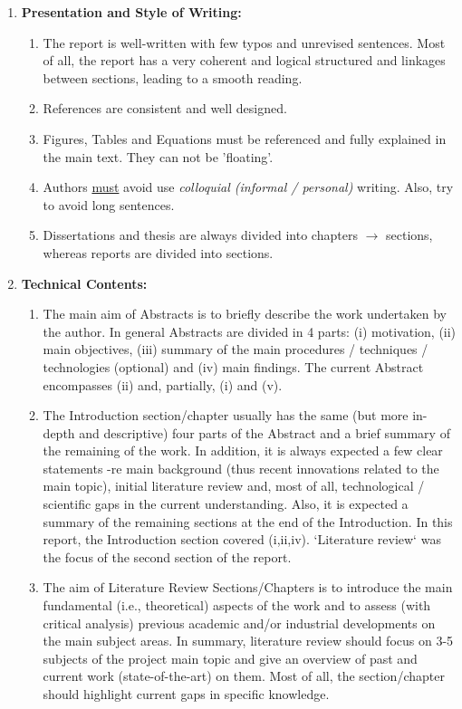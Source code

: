 \documentclass[14pt,twoside]{report}
\begin{document}
\begin{enumerate}
%
    \item {\bf Presentation and Style of Writing:}
                \begin{enumerate}
                   \item The report is well-written with few typos and unrevised sentences. Most of all, the report has a very coherent and logical structured and linkages between sections, leading to a smooth reading.
                   \item References are consistent and well designed. 
                   \item Figures, Tables and Equations must be referenced and fully explained in the main text. They can not be 'floating'.
                   \item Authors \underline{must} avoid use {\it colloquial (informal / personal)} writing. Also, try to avoid long sentences.
                   \item Dissertations and thesis are always divided into chapters $\rightarrow$ sections, whereas reports are divided into sections.
                \end{enumerate}
%
    \item {\bf Technical Contents:}
                \begin{enumerate}
                   \item The main aim of Abstracts is to briefly describe the work undertaken by the author. In general Abstracts are divided in 4 parts: (i) motivation, (ii) main objectives, (iii) summary of the main procedures / techniques / technologies (optional) and (iv) main findings. The current Abstract encompasses (ii) and, partially, (i) and (v).
                   \item The Introduction section/chapter usually has the same (but more in-depth and descriptive) four parts of the Abstract and a brief summary of the remaining of the work. In addition, it is always expected a few clear statements -re main background (thus recent innovations related to the main topic), initial literature review and, most of all, technological / scientific gaps in the current understanding. Also, it is expected a summary of the remaining sections at the end of the Introduction. In this report, the Introduction section covered (i,ii,iv). `Literature review` was the focus of the second section of the report. 
                   \item The aim of Literature Review Sections/Chapters is to introduce the main fundamental (i.e., theoretical) aspects of the work and to assess (with critical analysis) previous academic and/or industrial developments on the main subject areas. In summary, literature review should focus on 3-5 subjects of the project main topic and give an overview of past and current work (state-of-the-art) on them. Most of all, the section/chapter should highlight current gaps in specific knowledge.
                     

\end{enumerate}
\end{enumerate}
\end{document}
